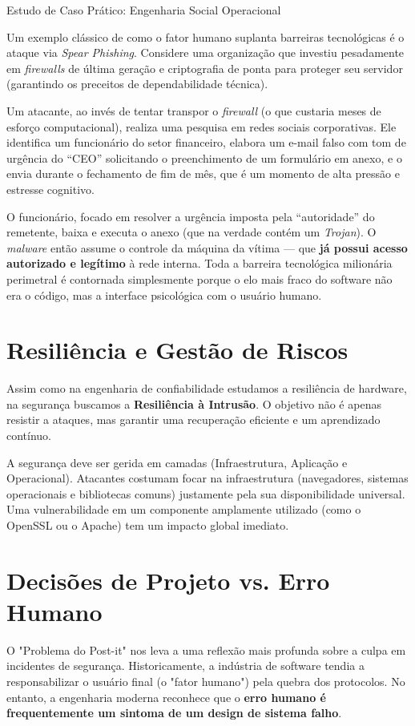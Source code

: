 \documentclass[12pt,a4paper,twoside]{report}
\begin{document}
\begin{block}{Estudo de Caso Prático: Engenharia Social Operacional}
 

    Um exemplo clássico de como o fator humano suplanta barreiras tecnológicas é o ataque via \textit{Spear Phishing}. Considere uma organização que investiu pesadamente em \textit{firewalls} de última geração e criptografia de ponta para proteger seu servidor (garantindo os preceitos de dependabilidade técnica).

Um atacante, ao invés de tentar transpor o \textit{firewall} (o que custaria meses de esforço computacional), realiza uma pesquisa em redes sociais corporativas. Ele identifica um funcionário do setor financeiro, elabora um e-mail falso com tom de urgência do ``CEO'' solicitando o preenchimento de um formulário em anexo, e o envia durante o fechamento de fim de mês, que é um momento de alta pressão e estresse cognitivo.

O funcionário, focado em resolver a urgência imposta pela ``autoridade'' do remetente, baixa e executa o anexo (que na verdade contém um \textit{Trojan}). O \textit{malware} então assume o controle da máquina da vítima — que \textbf{já possui acesso autorizado e legítimo} à rede interna. Toda a barreira tecnológica milionária perimetral é contornada simplesmente porque o elo mais fraco do software não era o código, mas a interface psicológica com o usuário humano.
\end{block}

\section{Resiliência e Gestão de Riscos}

Assim como na engenharia de confiabilidade estudamos a resiliência de hardware, na segurança buscamos a \textbf{Resiliência à Intrusão}. O objetivo não é apenas resistir a ataques, mas garantir uma recuperação eficiente e um aprendizado contínuo.

A segurança deve ser gerida em camadas (Infraestrutura, Aplicação e Operacional). Atacantes costumam focar na infraestrutura (navegadores, sistemas operacionais e bibliotecas comuns) justamente pela sua disponibilidade universal. Uma vulnerabilidade em um componente amplamente utilizado (como o OpenSSL ou o Apache) tem um impacto global imediato.

\section{Decisões de Projeto vs. Erro Humano}
O "Problema do Post-it" nos leva a uma reflexão mais profunda sobre a culpa em incidentes de segurança. Historicamente, a indústria de software tendia a responsabilizar o usuário final (o "fator humano") pela quebra dos protocolos. No entanto, a engenharia moderna reconhece que o \textbf{erro humano é frequentemente um sintoma de um design de sistema falho}.
\end{document}
